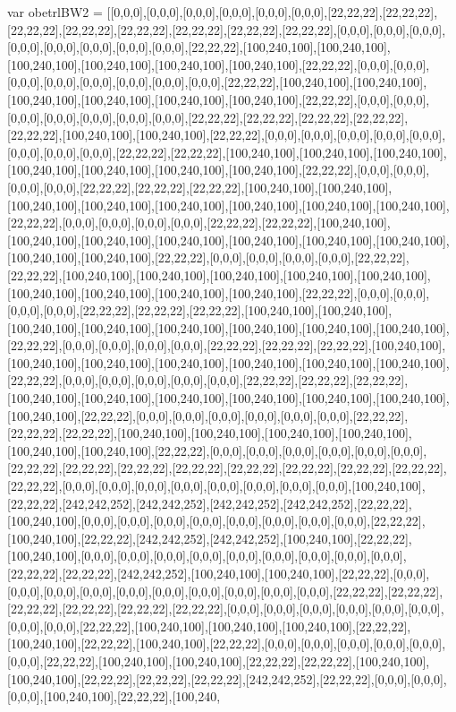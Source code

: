 var obetrlBW2 = [[0,0,0],[0,0,0],[0,0,0],[0,0,0],[0,0,0],[0,0,0],[22,22,22],[22,22,22],[22,22,22],[22,22,22],[22,22,22],[22,22,22],[22,22,22],[22,22,22],[0,0,0],[0,0,0],[0,0,0],[0,0,0],[0,0,0],[0,0,0],[0,0,0],[0,0,0],[22,22,22],[100,240,100],[100,240,100],[100,240,100],[100,240,100],[100,240,100],[100,240,100],[22,22,22],[0,0,0],[0,0,0],[0,0,0],[0,0,0],[0,0,0],[0,0,0],[0,0,0],[0,0,0],[22,22,22],[100,240,100],[100,240,100],[100,240,100],[100,240,100],[100,240,100],[100,240,100],[22,22,22],[0,0,0],[0,0,0],[0,0,0],[0,0,0],[0,0,0],[0,0,0],[0,0,0],[22,22,22],[22,22,22],[22,22,22],[22,22,22],[22,22,22],[100,240,100],[100,240,100],[22,22,22],[0,0,0],[0,0,0],[0,0,0],[0,0,0],[0,0,0],[0,0,0],[0,0,0],[0,0,0],[22,22,22],[22,22,22],[100,240,100],[100,240,100],[100,240,100],[100,240,100],[100,240,100],[100,240,100],[100,240,100],[22,22,22],[0,0,0],[0,0,0],[0,0,0],[0,0,0],[22,22,22],[22,22,22],[22,22,22],[100,240,100],[100,240,100],[100,240,100],[100,240,100],[100,240,100],[100,240,100],[100,240,100],[100,240,100],[22,22,22],[0,0,0],[0,0,0],[0,0,0],[0,0,0],[22,22,22],[22,22,22],[100,240,100],[100,240,100],[100,240,100],[100,240,100],[100,240,100],[100,240,100],[100,240,100],[100,240,100],[100,240,100],[22,22,22],[0,0,0],[0,0,0],[0,0,0],[0,0,0],[22,22,22],[22,22,22],[100,240,100],[100,240,100],[100,240,100],[100,240,100],[100,240,100],[100,240,100],[100,240,100],[100,240,100],[100,240,100],[22,22,22],[0,0,0],[0,0,0],[0,0,0],[0,0,0],[22,22,22],[22,22,22],[22,22,22],[100,240,100],[100,240,100],[100,240,100],[100,240,100],[100,240,100],[100,240,100],[100,240,100],[100,240,100],[22,22,22],[0,0,0],[0,0,0],[0,0,0],[0,0,0],[22,22,22],[22,22,22],[22,22,22],[100,240,100],[100,240,100],[100,240,100],[100,240,100],[100,240,100],[100,240,100],[100,240,100],[22,22,22],[0,0,0],[0,0,0],[0,0,0],[0,0,0],[0,0,0],[22,22,22],[22,22,22],[22,22,22],[100,240,100],[100,240,100],[100,240,100],[100,240,100],[100,240,100],[100,240,100],[100,240,100],[22,22,22],[0,0,0],[0,0,0],[0,0,0],[0,0,0],[0,0,0],[0,0,0],[22,22,22],[22,22,22],[22,22,22],[100,240,100],[100,240,100],[100,240,100],[100,240,100],[100,240,100],[100,240,100],[22,22,22],[0,0,0],[0,0,0],[0,0,0],[0,0,0],[0,0,0],[0,0,0],[22,22,22],[22,22,22],[22,22,22],[22,22,22],[22,22,22],[22,22,22],[22,22,22],[22,22,22],[22,22,22],[0,0,0],[0,0,0],[0,0,0],[0,0,0],[0,0,0],[0,0,0],[0,0,0],[0,0,0],[100,240,100],[22,22,22],[242,242,252],[242,242,252],[242,242,252],[242,242,252],[22,22,22],[100,240,100],[0,0,0],[0,0,0],[0,0,0],[0,0,0],[0,0,0],[0,0,0],[0,0,0],[0,0,0],[22,22,22],[100,240,100],[22,22,22],[242,242,252],[242,242,252],[100,240,100],[22,22,22],[100,240,100],[0,0,0],[0,0,0],[0,0,0],[0,0,0],[0,0,0],[0,0,0],[0,0,0],[0,0,0],[0,0,0],[22,22,22],[22,22,22],[242,242,252],[100,240,100],[100,240,100],[22,22,22],[0,0,0],[0,0,0],[0,0,0],[0,0,0],[0,0,0],[0,0,0],[0,0,0],[0,0,0],[0,0,0],[0,0,0],[22,22,22],[22,22,22],[22,22,22],[22,22,22],[22,22,22],[22,22,22],[0,0,0],[0,0,0],[0,0,0],[0,0,0],[0,0,0],[0,0,0],[0,0,0],[0,0,0],[22,22,22],[100,240,100],[100,240,100],[100,240,100],[22,22,22],[100,240,100],[22,22,22],[100,240,100],[22,22,22],[0,0,0],[0,0,0],[0,0,0],[0,0,0],[0,0,0],[0,0,0],[22,22,22],[100,240,100],[100,240,100],[22,22,22],[22,22,22],[100,240,100],[100,240,100],[22,22,22],[22,22,22],[22,22,22],[242,242,252],[22,22,22],[0,0,0],[0,0,0],[0,0,0],[100,240,100],[22,22,22],[100,240,